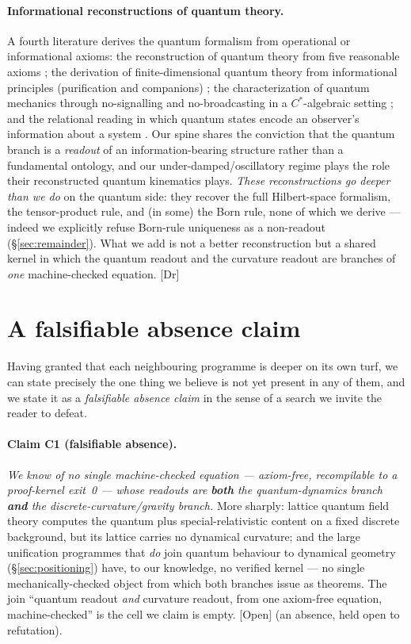 \documentclass[10pt,twocolumn]{article}
\theoremstyle{definition}
\newcommand{\Dr}{\textsf{[Dr]}}
\newcommand{\Open}{\textsf{[Open]}}
\begin{document}
\paragraph{Informational reconstructions of quantum theory.} A fourth literature derives
the quantum formalism from operational or informational axioms: the reconstruction of
quantum theory from five reasonable axioms \cite{hardy2001}; the derivation of
finite-dimensional quantum theory from informational principles (purification and companions)
\cite{cdp2011}; the characterization of quantum mechanics through no-signalling and
no-broadcasting in a $C^{*}$-algebraic setting \cite{cbh2003}; and the relational reading in
which quantum states encode an observer's information about a system \cite{rovellirqm1996}. Our spine shares the conviction that the quantum
branch is a \emph{readout} of an information-bearing structure rather than a fundamental
ontology, and our under-damped/oscillatory regime plays the role their reconstructed
quantum kinematics plays. \emph{These reconstructions go deeper than we do} on the quantum
side: they recover the full Hilbert-space formalism, the tensor-product rule, and
(in some) the Born rule, none of which we derive --- indeed we explicitly refuse Born-rule
uniqueness as a non-readout (\S\ref{sec:remainder}). What we add is not a better
reconstruction but a shared kernel in which the quantum readout and the curvature readout
are branches of \emph{one} machine-checked equation. \Dr{}

\section{A falsifiable absence claim}\label{sec:absence}

Having granted that each neighbouring programme is deeper on its own turf, we can state
precisely the one thing we believe is not yet present in any of them, and we state it as a
\emph{falsifiable absence claim} in the sense of a search we invite the reader to defeat.

\paragraph{Claim C1 (falsifiable absence).} \emph{We know of no single machine-checked
equation --- axiom-free, recompilable to a proof-kernel exit~0 --- whose readouts are
\textbf{both} the quantum-dynamics branch \textbf{and} the discrete-curvature/gravity
branch.} More sharply: lattice quantum field theory computes the quantum plus
special-relativistic content on a fixed discrete background, but its lattice carries no
dynamical curvature; and the large unification programmes that \emph{do} join quantum
behaviour to dynamical geometry (\S\ref{sec:positioning}) have, to our knowledge, no
verified kernel --- no single mechanically-checked object from which both branches issue as
theorems. The join ``quantum readout \emph{and} curvature readout, from one axiom-free
equation, machine-checked'' is the cell we claim is empty. \Open{} (an absence, held open
to refutation).
\end{document}
